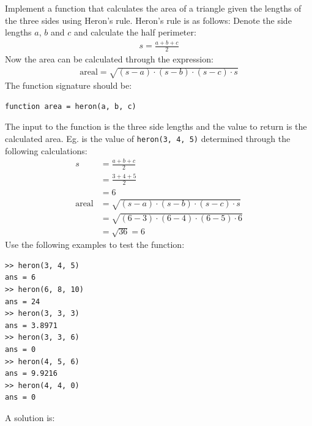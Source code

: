 \begin{ex}
Implement a function that calculates the area of a triangle 
given the lengths of the three sides using Heron's rule.
Heron's rule is as follows:
Denote the side lengths $a$, $b$ and $c$ and calculate 
the half perimeter:
\begin{align*}
s = \frac{a + b + c}{2}
\end{align*}
Now the area can be calculated through the expression:
\begin{align*}
\textrm{areal} = \sqrt{(s - a) \cdot (s - b) \cdot (s - c) \cdot s}
\end{align*}
The function signature should be:
\begin{lstlisting}
function area = heron(a, b, c)
\end{lstlisting}
The input to the function is the three side lengths
and the value to return is the calculated area.
Eg. is the value of \verb!heron(3, 4, 5)! determined through
the following calculations:
\begin{align*}
s & = \frac{a + b + c}{2} \\ 
& = \frac{3 + 4 + 5}{2} \\
& = 6 \\
\textrm{areal} & = \sqrt{(s - a) \cdot (s - b) \cdot (s - c) \cdot s} \\
& = \sqrt{(6 - 3) \cdot (6 - 4) \cdot (6 - 5) \cdot 6} \\
& = \sqrt{36} = 6
\end{align*}
Use the following examples to test the function:
\begin{lstlisting}
>> heron(3, 4, 5)
ans = 6
>> heron(6, 8, 10)
ans = 24
>> heron(3, 3, 3)
ans = 3.8971
>> heron(3, 3, 6)
ans = 0
>> heron(4, 5, 6)
ans = 9.9216
>> heron(4, 4, 0)
ans = 0
\end{lstlisting}
\begin{hint}
\end{hint}
\begin{sol}
A solution is:
\begin{lstlisting}
\end{lstlisting}
\end{sol}
\end{ex}
 